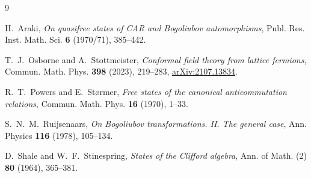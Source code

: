 \begin{thebibliography}{9}

H.~Araki,
\emph{On quasifree states of CAR and Bogoliubov automorphisms},
Publ. Res. Inst. Math. Sci. \textbf{6} (1970/71), 385--442.

T.~J.~Osborne and A.~Stottmeister,
\emph{Conformal field theory from lattice fermions},
Commun. Math. Phys. \textbf{398} (2023), 219--283,
\href{https://arxiv.org/abs/2107.13834}{arXiv:2107.13834}.

R.~T.~Powers and E.~St{\o}rmer,
\emph{Free states of the canonical anticommutation relations},
Commun. Math. Phys. \textbf{16} (1970), 1--33.

S.~N.~M.~Ruijsenaars,
\emph{On Bogoliubov transformations. II. The general case},
Ann. Physics \textbf{116} (1978), 105--134.

D.~Shale and W.~F.~Stinespring,
\emph{States of the Clifford algebra},
Ann. of Math. (2) \textbf{80} (1964), 365--381.

\end{thebibliography}


